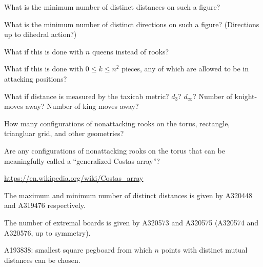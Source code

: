 \documentclass{article}
\begin{document}
\begin{question}
  What is the minimum number of distinct distances on such a figure?
\end{question}
\begin{related}
  \item What is the minimum number of distinct directions on such a figure?
    (Directions up to dihedral action?)
  \item What if this is done with $n$ queens instead of rooks?
  \item What if this is done with $0 \leq k \leq n^2$ pieces, any of which are allowed
    to be in attacking positions?
  \item What if distance is measured by the taxicab metric? $d_3$? $d_\infty$?
  Number of knight-moves away? Number of king moves away?
  \item How many configurations of nonattacking rooks on the torus, rectangle,
  triangluar grid, and other geometries?
  \item Are any configurations of nonattacking rooks on the torus that can
    be meaningfully called a ``generalized Costas array''?
\end{related}
\begin{references}
  \item \url{https://en.wikipedia.org/wiki/Costas_array}
  \item The maximum and minimum number of distinct distances is given by
  A320448 and A319476 respectively.
  \item The number of extremal boards is given by
  A320573 and A320575 (A320574 and A320576, up to symmetry).
  \item A193838: smallest square pegboard from which $n$ points with distinct mutual distances can be chosen.
\end{references}
\end{document}
